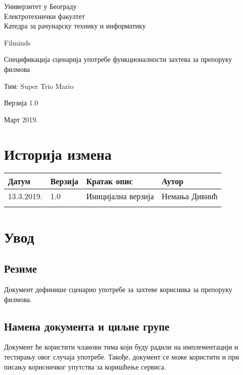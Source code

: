 \documentclass[12pt,a4paper]{article}
\begin{document}
\begin{titlepage}
\begin{center}
  Универзитет у Београду \\
  Електротехнички факултет \\
  Катедра за рачунарску технику и информатику \\
  \vfill

  {\fontsize{50}{60}\selectfont Filminds}
  \vskip 0.6cm

  {\large Спецификација сценарија употребе функционалности захтева за препоруку филмова  }
  \vskip 0.3cm
  
  {\large Тим: Super Trio Mario}
  \vskip 0.3cm

  {\large Верзија 1.0}

  \vfill
  \vfill

  Март 2019.
\hfill

\end{center}
\end{titlepage}

\section*{Историја измена}
\noindent
\setcellgapes{4pt}
\makegapedcells
\begin{tabularx}{\linewidth}{|l|l|X|X|}
    \hline
    \textbf{Датум} & \textbf{Верзија} & \textbf{Кратак опис} & \textbf{Аутор} \\
    \hline
    13.3.2019. & 1.0 & Иницијална верзија & Немања Дивнић \\
    \hline
    & & & \\
    \hline
\end{tabularx}
\newpage

\tableofcontents
\newpage

\section{Увод}
\subsection{Резиме}
Документ дефинише сценарио употребе за захтеве корисника за препоруку филмова.
\subsection{Намена документа и циљне групе}
Документ ће користити чланови тима који буду радили на имплементацији и тестирању овог случаја употребе. Такође, документ се може користити и при писању корисничког упутства за коришћење сервиса.
\end{document}
